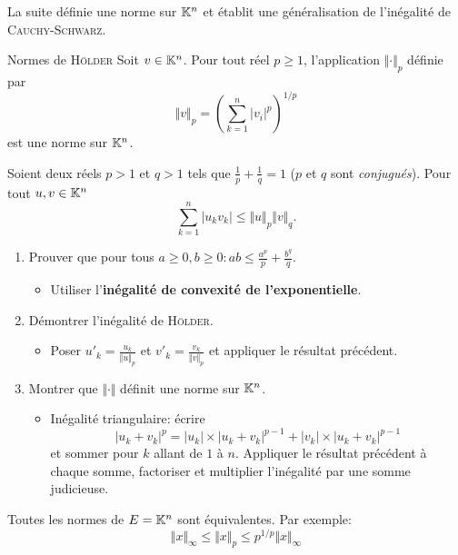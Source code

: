 La suite définie une norme sur $\mathbb{K}^n$ et établit une généralisation de l'inégalité de \textsc{Cauchy}-\textsc{Schwarz}. 
\begin{defi}{Normes de \textsc{Hölder}}
    Soit $v \in \mathbb{K}^n$. Pour tout réel $p \geqslant 1$, l'application $\Vert \bm{\cdot} \Vert_p$ définie par
    $$\Vert v \Vert_p = \left (\sum_{k=1}^{n} |v_i|^p \right)^{1/p}$$
    est une norme sur $\mathbb{K}^n$.
\end{defi}

\begin{prop}
    Soient deux réels $p > 1$ et $q > 1$ tels que $\frac{1}{p} + \frac{1}{q} = 1$ ($p$ et $q$ sont \emph{conjugués}). Pour tout $u, v \in \mathbb{K}^n$
    $$\sum_{k=1}^{n} |u_k v_k| \leqslant \Vert u \Vert_p \Vert v \Vert_q.$$
\end{prop}

\begin{preuve}
    \begin{enumerate}
        \item Prouver que pour tous $a \geqslant 0, b \geqslant 0: ab \leqslant \frac{a^p}{p} + \frac{b^q}{q}$.
        \begin{itemize}
            \item Utiliser l'\textbf{inégalité de convexité de l'exponentielle}.
        \end{itemize}
        \item Démontrer l'inégalité de \textsc{Hölder}.
        \begin{itemize}
            \item Poser $u'_k = \frac{u_k}{\Vert u \Vert_p}$ et $v'_k = \frac{v_k}{\Vert v \Vert_p}$ et appliquer le résultat précédent. 
        \end{itemize}
        \item Montrer que $\Vert \bm{\cdot} \Vert$ définit une norme sur $\mathbb{K}^n$.
        \begin{itemize}
            \item Inégalité triangulaire: écrire 
            $$|u_k + v_k|^p = |u_k| \times |u_k + v_k|^{p-1} + |v_k| \times |u_k + v_k|^{p-1}$$ 
            et sommer pour $k$ allant de $1$ à $n$. Appliquer le résultat précédent à chaque somme, factoriser et multiplier l'inégalité par une somme judicieuse. 
        \end{itemize}
    \end{enumerate}
\end{preuve}     

\begin{prop}
    Toutes les normes de $E = \mathbb{K}^n$ sont équivalentes. Par exemple:
    $$\Vert x \Vert_\infty \leqslant \Vert x \Vert_p \leqslant p^{1/p} \Vert x \Vert_\infty$$
\end{prop}
